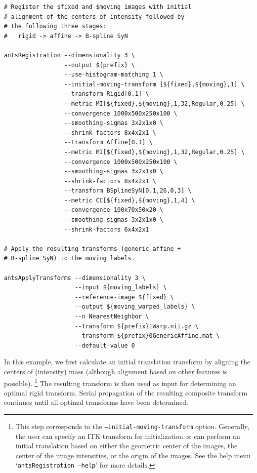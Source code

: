 \documentclass{frontiersSCNS}
\begin{document}
\begin{lstlisting}
# Register the $fixed and $moving images with initial
# alignment of the centers of intensity followed by 
# the following three stages:
#   rigid -> affine -> B-spline SyN

antsRegistration --dimensionality 3 \
                 --output ${prefix} \
                 --use-histogram-matching 1 \
                 --initial-moving-transform [${fixed},${moving},1] \
                 --transform Rigid[0.1] \
                 --metric MI[${fixed},${moving},1,32,Regular,0.25] \ 
                 --convergence 1000x500x250x100 \
                 --smoothing-sigmas 3x2x1x0 \
                 --shrink-factors 8x4x2x1 \
                 --transform Affine[0.1] \
                 --metric MI[${fixed},${moving},1,32,Regular,0.25] \ 
                 --convergence 1000x500x250x100 \
                 --smoothing-sigmas 3x2x1x0 \
                 --shrink-factors 8x4x2x1 \
                 --transform BSplineSyN[0.1,26,0,3] \
                 --metric CC[${fixed},${moving},1,4] \ 
                 --convergence 100x70x50x20 \
                 --smoothing-sigmas 3x2x1x0 \
                 --shrink-factors 6x4x2x1

# Apply the resulting transforms (generic affine + 
# B-spline SyN) to the moving labels.
                   
antsApplyTransforms --dimensionality 3 \
                    --input ${moving_labels} \
                    --reference-image ${fixed} \
                    --output ${moving_warped_labels} \
                    --n NearestNeighbor \
                    --transform ${prefix}1Warp.nii.gz \
                    --transform ${prefix}0GenericAffine.mat \
                    --default-value 0
\end{lstlisting}
In this example, we first calculate an initial translation transform by aligning
the centers of (intensity) mass (although alignment based on other features is possible).%
\footnote{
This step corresponds to the {\tt --initial-moving-transform} option.  Generally, the
user can specify an ITK transform for initialization or can perform an initial
translation based on either the geometric center of the images, the center of the
image intensities, or the origin of the images.  See the help menu `{\tt antsRegistration --help}' for more details.
} 
The resulting transform is then used as input 
for determining an optimal rigid transform.  Serial propagation of the resulting
composite transform continues until all optimal transforms have been determined.
\end{document}

